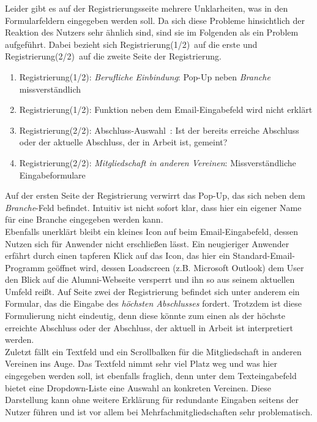 \label{prob:reg:roterStern}
{Leider gibt es auf der Registrierungsseite mehrere Unklarheiten, was in den Formularfeldern eingegeben werden soll. Da sich diese Probleme hinsichtlich der Reaktion
des Nutzers sehr ähnlich sind, sind sie im Folgenden als ein Problem aufgeführt. Dabei bezieht sich \glqq Registrierung(1/2)\grqq ~auf die erste und \glqq Registrierung(2/2)\grqq ~auf die zweite Seite der Registrierung.
\begin{enumerate}
	\item {Registrierung(1/2): \emph{Berufliche Einbindung}: Pop-Up neben \emph{Branche} miss\-ver\-ständ\-lich}
	\item {Registrierung(1/2): Funktion neben dem Email-Eingabefeld wird nicht erklärt}
	\item {Registrierung(2/2): \glqq Abschluss-Auswahl\grqq ~: Ist der bereits erreiche Abschluss oder der aktuelle Abschluss, der in Arbeit ist, gemeint?}
	\item {Registrierung(2/2): \emph{Mitgliedschaft in anderen Vereinen}: Missverständliche Eingabeformulare}	
\end{enumerate}	
Auf der ersten Seite der Registrierung verwirrt das Pop-Up, das sich neben dem \emph{Branche}-Feld befindet. Intuitiv ist nicht sofort klar, dass hier ein eigener
Name für eine Branche eingegeben werden kann.\\
Ebenfalls unerklärt bleibt ein kleines Icon auf beim Email-Eingabefeld, dessen Nutzen sich für Anwender nicht erschließen lässt. Ein neugieriger Anwender erfährt durch einen tapferen Klick auf das Icon, das hier ein Standard-Email-Programm geöffnet wird, dessen Loadscreen (z.B. Microsoft Outlook) dem User den Blick auf die Alumni-Webseite versperrt und ihn so aus seinem aktuellen Umfeld reißt.
Auf Seite zwei der Registrierung befindet sich unter anderem ein Formular, das die Eingabe des \emph{höchsten Abschlusses} fordert. Trotzdem ist diese Formulierung nicht eindeutig,
denn diese könnte zum einen als der höchste erreichte Abschluss oder der Abschluss, der aktuell in Arbeit ist interpretiert werden.\\
Zuletzt fällt ein Textfeld und ein Scrollbalken für die Mitgliedschaft in anderen Vereinen ins Auge. Das Textfeld nimmt sehr viel Platz weg und was hier eingegeben werden soll, ist ebenfalls fraglich, denn unter dem Texteingabefeld bietet eine Dropdown-Liste eine Auswahl an konkreten Vereinen. Diese Darstellung kann ohne weitere Erklärung für redundante Eingaben seitens der Nutzer führen und ist vor allem bei Mehrfachmitgliedschaften sehr problematisch.
}
